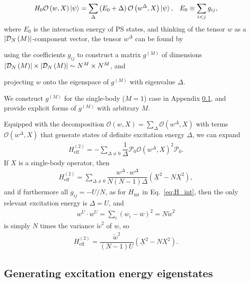 \documentclass[nofootinbib,twocolumn]{revtex4-2}
\renewcommand{\t}{\text} %
\newcommand{\f}[2]{\dfrac{#1}{#2}} %
\newcommand{\p}[1]{\left(#1\right)} %
\renewcommand{\c}{\cdot} %
\newcommand{\1}{\mathds{1}}
\newcommand{\D}{\mathcal{D}}
\renewcommand{\O}{\mathcal{O}}
\renewcommand{\P}{\mathcal{P}}
\newcommand{\col}{\underline}
\newcommand{\mean}{\overline}
\begin{document}
\begin{align}
  H_0 \O\p{w,X} \ket\psi
  = \sum_\Delta \p{E_0+\Delta} \O\p{w^\Delta,X} \ket\psi,
  &&
  E_0 \equiv \sum_{i<j} g_{ij},
  \label{eq:excitation}
\end{align}
where $E_0$ is the interaction energy of PS states, and thinking of the tensor $w$ as a $\abs{\D_N\p{M}}$-component vector, the tensor $w^\Delta$ can be found by
\begin{enumerate*}
\item using the coefficients $g_{ij}$ to construct a matrix $g^{(M)}$ of dimensions $\abs{\D_N\p{M}}\times\abs{\D_N\p{M}}\sim N^M\times N^M$, and
\item projecting $w$ onto the eigenspace of $g^{(M)}$ with eigenvalue $\Delta$.
\end{enumerate*}
We construct $g^{(M)}$ for the single-body ($M=1$) case in Appendix \ref{sec:eigenstates}, and provide explicit forms of $g^{(M)}$ with arbitrary $M$.

Equipped with the decomposition $\O\p{w,X}=\sum_\Delta\O\p{w^\Delta,X}$ with terms $\O\p{w^\Delta,X}$ that generate states of definite excitation energy $\Delta$, we can expand
\begin{align}
  H_{\t{eff}}^{(2)} = -\sum_{\Delta\ne0} \f1\Delta
  \P_0 \O\p{w^\Delta,X}^2 \P_0.
\end{align}
If $X$ is a single-body operator, then
\begin{align}
  H_{\t{eff}}^{(2)}
  = \sum_{\Delta\ne0} \f{w^\Delta\c w^\Delta}{N\p{N-1}\Delta}
  \p{\col{X}^2 - N \col{X^2}},
\end{align}
and if furthermore all $g_{ij}=-U/N$, as for $H_{\t{int}}$ in Eq.~\eqref{eq:H_int}, then the only relevant excitation energy is $\Delta=U$, and
\begin{align}
  w^U\c w^U = \sum_i \p{w_i-\mean w}^2 = N \widetilde{w}^2
\end{align}
is simply $N$ times the variance $\widetilde{w}^2$ of $w$, so
\begin{align}
  H_{\t{eff}}^{(2)}
  = \f{\widetilde{w}^2}{\p{N-1}U} \p{\col{X}^2 - N \col{X^2}}.
\end{align}

\subsection{Generating excitation energy eigenstates}
\label{sec:eigenstates}
\end{document}

